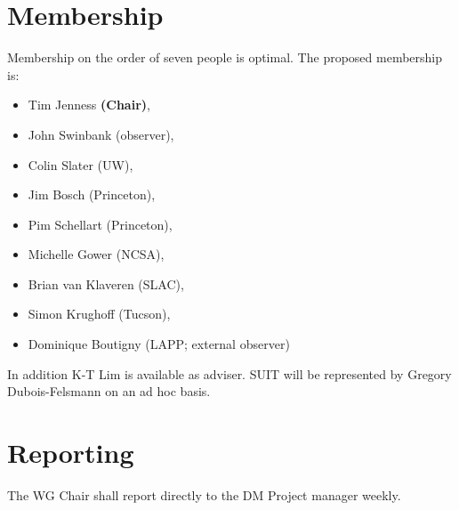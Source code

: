 \section{Membership}

Membership on the order of seven people is optimal.
The proposed membership is:

\begin{itemize}
  \item Tim Jenness \textbf{(Chair)},
  \item John Swinbank (observer),
  \item Colin Slater (UW),
  \item Jim Bosch (Princeton),
  \item Pim Schellart (Princeton),
  \item Michelle Gower (NCSA),
  \item Brian van Klaveren (SLAC),
  \item Simon Krughoff (Tucson),
  \item Dominique Boutigny (LAPP; external observer)
\end{itemize}

In addition K-T Lim is available as adviser.
SUIT will be represented by Gregory Dubois-Felsmann on an ad hoc basis.

\section{Reporting}

The WG Chair shall report directly to the DM Project manager weekly.
